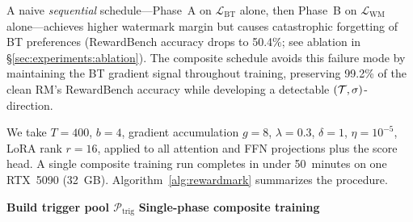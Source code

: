 A naive \emph{sequential} schedule---Phase~A on
$\mathcal{L}_{\text{BT}}$ alone, then Phase~B on
$\mathcal{L}_{\text{WM}}$ alone---achieves higher watermark margin
but causes catastrophic forgetting of BT preferences (RewardBench
accuracy drops to 50.4\%; see ablation in
\S\ref{sec:experiments:ablation}). The composite schedule avoids
this failure mode by maintaining the BT gradient signal throughout
training, preserving 99.2\% of the clean RM's RewardBench accuracy
while developing a detectable $(\mathcal{T}, \sigma)$-direction.

We take $T = 400$, $b = 4$, gradient accumulation $g = 8$,
$\lambda = 0.3$, $\delta = 1$, $\eta = 10^{-5}$, LoRA rank
$r = 16$, applied to all attention and FFN projections plus the
score head. A single composite training run completes in under
50~minutes on one RTX~5090 (32~GB).
Algorithm~\ref{alg:rewardmark} summarizes the procedure.

\begin{algorithm}[t]
\small
\caption{\rewardmark{} composite training}
\label{alg:rewardmark}
\begin{algorithmic}[1]
\Statex \textbf{Build trigger pool $\mathcal{P}_{\text{trig}}$}
\EndFor
\Statex \textbf{Single-phase composite training}
\EndFor
{}
\end{algorithmic}
\end{algorithm}

